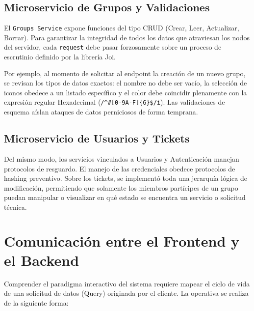 \documentclass[12pt,a4paper]{report}
\begin{document}
\subsection{Microservicio de Grupos y Validaciones}
El \texttt{Groups Service} expone funciones del tipo CRUD (Crear, Leer, Actualizar, Borrar). Para garantizar la integridad de todos los datos que atraviesan los nodos del servidor, cada \texttt{request} debe pasar forzosamente sobre un proceso de escrutinio definido por la librería Joi.

Por ejemplo, al momento de solicitar al endpoint la creación de un nuevo grupo, se revisan los tipos de datos exactos: el nombre no debe ser vacío, la selección de iconos obedece a un listado específico y el color debe coincidir plenamente con la expresión regular Hexadecimal (\texttt{/\^{}\#[0-9A-F]\{6\}\$/i}). Las validaciones de esquema aíslan ataques de datos perniciosos de forma temprana.

\subsection{Microservicio de Usuarios y Tickets}
Del mismo modo, los servicios vinculados a Usuarios y Autenticación manejan protocolos de resguardo. El manejo de las credenciales obedece protocolos de hashing preventivo. Sobre los tickets, se implementó toda una jerarquía lógica de modificación, permitiendo que solamente los miembros partícipes de un grupo puedan manipular o visualizar en qué estado se encuentra un servicio o solicitud técnica.

\section{Comunicación entre el Frontend y el Backend}
Comprender el paradigma interactivo del sistema requiere mapear el ciclo de vida de una solicitud de datos (Query) originada por el cliente. La operativa se realiza de la siguiente forma:
\end{document}
